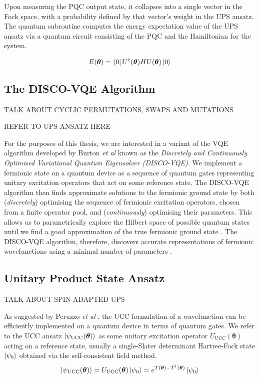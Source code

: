 Upon measuring the PQC output state, it collapses into a single vector in the Fock space, with a probability defined by that vector's weight in the UPS ansatz. The quantum subroutine computes the energy expectation value of the UPS ansatz via a quantum circuit consisting of the PQC and the Hamiltonian for the system.

\begin{equation*}
    E(\bm\theta) = \bra{0} U^\dagger(\bm\theta) H U(\bm\theta) \ket{0} 
\end{equation*}

\subsection{The DISCO-VQE Algorithm}%
\label{disco}

TALK ABOUT CYCLIC PERMUTATIONS, SWAPS AND MUTATIONS

REFER TO UPS ANSATZ HERE

For the purposes of this thesis, we are interested in a variant of the VQE algorithm developed by Burton \textit{et al} \cite{Burton2023} known as the \textit{Discretely and Continuously Optimised Variational Quantum Eigensolver (DISCO-VQE)}. We implement a fermionic state on a quantum device as a sequence of quantum gates representing unitary excitation operators that act on some reference state. The DISCO-VQE algorithm then finds approximate solutions to the fermionic ground state by both (\textit{discretely}) optimising the sequence of fermionic excitation operators, chosen from a finite operator pool, and (\textit{continuously}) optimising their parameters. This allows us to parametrically explore the Hilbert space of possible quantum states until we find a good approximation of the true fermionic ground state \cite{Taube2006}. The DISCO-VQE algorithm, therefore, discovers accurate representations of fermionic wavefunctions using a minimal number of parameters \cite{Burton2023}.


\subsection{Unitary Product State Ansatz}%
\label{ups-ansatz}

TALK ABOUT SPIN ADAPTED UPS

As suggested by Peruzzo \textit{et al} \cite{Peruzzo2014}, the UCC formulation of a wavefunction can be efficiently implemented on a quantum device in terms of quantum gates. We refer to the UCC ansatz $\ket{\psi_{\text{UCC}}(\bm\theta)}$ as some unitary excitation operator $U_\text{UCC}(\bm\theta)$ acting on a reference state, usually a single-Slater determinant Hartree-Fock state $\ket{\psi_0}$ obtained via the self-consistent field method.
\begin{equation*}
    \ket{\psi_{\text{UCC}}(\bm\theta)} = U_\text{UCC}(\bm\theta) \ket{\psi_0} =
    e^{\hat T(\bm\theta) - \hat T^\dagger(\bm\theta)} \ket{\psi_0}
\end{equation*}

